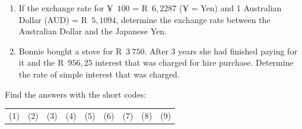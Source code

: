 \begin{eocexercises}{}
\begin{enumerate}[label=\textbf{\arabic*}.]
	\item If the exchange rate for ¥~$100$ = R~$6,2287$ (¥ = Yen) and 1 Australian Dollar (AUD) = R~$5,1094$, determine the exchange rate between the Australian Dollar and the Japanese Yen.

	\item Bonnie bought a stove for R~$3~750$. After 3 years she had finished paying for it and the R~$956,25$ interest that was charged for hire purchase. Determine the rate of simple interest that was charged.
    \end{enumerate}

    Find the answers with the short codes:\\
    \begin{tabularx}{\textwidth}{ XXXXXXXXX }
	(1) & (2) & (3) & (4) & (5) & (6) & (7) & (8) & (9)\\
    \end{tabularx}
\end{eocexercises}
